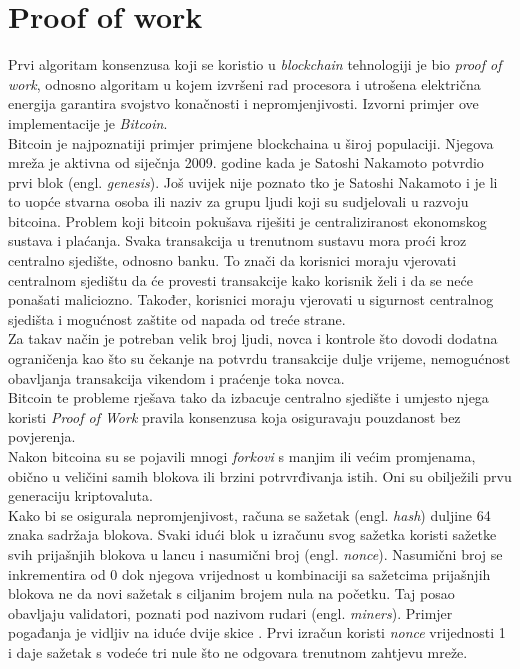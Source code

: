 \documentclass[times, utf8, zavrsni, numeric]{fer}
\begin{document}
\section{Proof of work}
Prvi algoritam konsenzusa koji se koristio u \emph{blockchain} tehnologiji je bio \emph{proof of work},
 odnosno algoritam u kojem izvršeni rad procesora i utrošena električna energija
garantira svojstvo konačnosti i nepromjenjivosti. Izvorni primjer ove implementacije je \emph{Bitcoin}. \\
Bitcoin je najpoznatiji primjer primjene blockchaina u široj populaciji. Njegova mreža je aktivna 
od siječnja 2009. godine kada je Satoshi Nakamoto potvrdio prvi blok (engl. \emph{genesis}).
Još uvijek nije poznato tko je Satoshi Nakamoto i je li to uopće stvarna osoba ili naziv za grupu
ljudi koji su sudjelovali u razvoju bitcoina. Problem koji bitcoin pokušava riješiti je centraliziranost
ekonomskog sustava i plaćanja. Svaka transakcija u trenutnom sustavu mora proći kroz centralno sjedište,
odnosno banku. To znači da korisnici moraju vjerovati centralnom sjedištu da će provesti transakcije
kako korisnik želi i da se neće ponašati maliciozno. Također, korisnici moraju vjerovati u sigurnost
centralnog sjedišta i mogućnost zaštite od napada od treće strane. \\
Za takav način je potreban velik broj ljudi, novca i kontrole što dovodi dodatna ograničenja kao što 
su čekanje na potvrdu transakcije dulje vrijeme, nemogućnost obavljanja transakcija vikendom i praćenje
toka novca. \\
Bitcoin te probleme rješava tako da izbacuje centralno sjedište i umjesto njega koristi \emph{Proof of Work}
pravila konsenzusa koja osiguravaju pouzdanost bez povjerenja. \\
Nakon bitcoina su se pojavili mnogi \emph{forkovi} s manjim ili većim promjenama, obično u veličini
samih blokova ili brzini potrvrđivanja istih. Oni su obilježili prvu generaciju kriptovaluta. \\
Kako bi se osigurala nepromjenjivost, računa se sažetak (engl. \emph{hash}) duljine 64 znaka sadržaja blokova. 
Svaki idući blok u izračunu svog sažetka koristi sažetke svih prijašnjih blokova u lancu i nasumični broj (engl. \emph{nonce}). Nasumični broj se inkrementira od 0
dok njegova vrijednost u kombinaciji sa sažetcima prijašnjih blokova ne da novi sažetak s ciljanim brojem nula na početku. Taj posao obavljaju validatori, poznati pod nazivom
rudari (engl. \emph{miners}). Primjer pogađanja je vidljiv na iduće dvije skice \citep{PoWAsync}. Prvi izračun koristi \emph{nonce} vrijednosti 1 i daje sažetak s vodeće
tri nule što ne odgovara trenutnom zahtjevu mreže.
\end{document}
